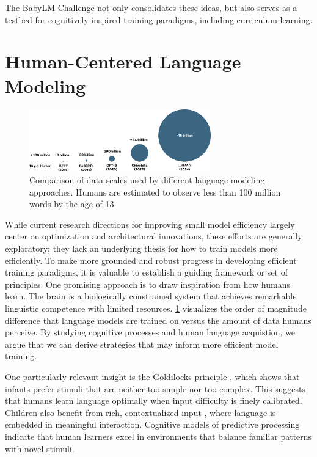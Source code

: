 The BabyLM Challenge not only consolidates these ideas, but also serves as a testbed for cognitively-inspired training paradigms, including curriculum learning.

\section{Human-Centered Language Modeling}

\begin{figure}[ht!]
    \centering
    \includegraphics[width=0.7\textwidth]{chapters/background/figures/data_comparison.pdf}
    \caption{Comparison of data scales used by different language modeling approaches. Humans are estimated to observe less than 100 million words by the age of 13.}
    \label{fig:data-comparison}
\end{figure}


While current research directions for improving small model efficiency largely center on optimization and architectural innovations, these efforts are generally exploratory; they lack an underlying thesis for how to train models more efficiently. To make more grounded and robust progress in developing efficient training paradigms, it is valuable to establish a guiding framework or set of principles. One promising approach is to draw inspiration from how humans learn. The brain is a biologically constrained system that achieves remarkable linguistic competence with limited resources. \cref{fig:data-comparison} visualizes the order of magnitude difference that language models are trained on versus the amount of data humans perceive. By studying cognitive processes and human language acquistion, we argue that we can derive strategies that may inform more efficient model training.

One particularly relevant insight is the Goldilocks principle \citep{kidd2012goldilocks}, which shows that infants prefer stimuli that are neither too simple nor too complex. This suggests that humans learn language optimally when input difficulty is finely calibrated. Children also benefit from rich, contextualized input \citep{bergelson2015early, weizman2001lexical}, where language is embedded in meaningful interaction. Cognitive models of predictive processing~\citep{caucheteux2023evidence} indicate that human learners excel in environments that balance familiar patterns with novel stimuli. 

